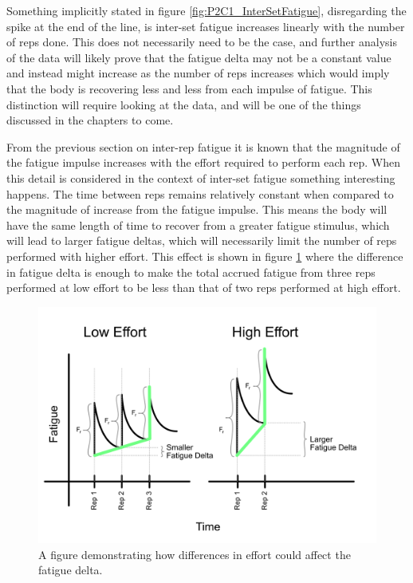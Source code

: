 Something implicitly stated in figure \ref{fig:P2C1_InterSetFatigue}, disregarding the spike at the end of the line, is inter-set fatigue increases linearly with the number of reps done. This does not necessarily need to be the case, and further analysis of the data will likely prove that the fatigue delta may not be a constant value and instead might increase as the number of reps increases which would imply that the body is recovering less and less from each impulse of fatigue. This distinction will require looking at the data, and will be one of the things discussed in the chapters to come.

From the previous section on inter-rep fatigue it is known that the magnitude of the fatigue impulse increases with the effort required to perform each rep. When this detail is considered in the context of inter-set fatigue something interesting happens. The time between reps remains relatively constant when compared to the magnitude of increase from the fatigue impulse. This means the body will have the same length of time to recover from a greater fatigue stimulus, which will lead to larger fatigue deltas, which will necessarily limit the number of reps performed with higher effort. This effect is shown in figure \ref{fig:P2C1_InterSetFatigueScaledByEffort} where the difference in fatigue delta is enough to make the total accrued fatigue from three reps performed at low effort to be less than that of two reps performed at high effort.

\begin{figure}[htb]
    \centering
    \includegraphics[scale=0.55]{images/p2/ch1/InterSetFatigueDeltaDifference.png}
    \caption{A figure demonstrating how differences in effort could affect the fatigue delta.}
    \label{fig:P2C1_InterSetFatigueScaledByEffort}
\end{figure}

